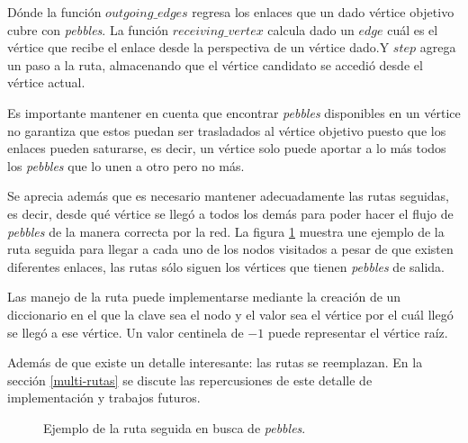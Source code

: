 Dónde la función $outgoing\_edges$ regresa los enlaces que un dado vértice objetivo cubre con \emph{pebbles}. La función $receiving\_vertex$ calcula dado un $edge$ cuál es el vértice que recibe el enlace desde la perspectiva de un vértice dado.Y $step$ agrega un paso a la ruta, almacenando que el vértice candidato se accedió desde el vértice actual.

Es importante mantener en cuenta que encontrar \emph{pebbles} disponibles en un vértice no garantiza que estos puedan ser trasladados al vértice objetivo puesto que los enlaces pueden saturarse, es decir, un vértice solo puede aportar a lo más todos los \emph{pebbles} que lo unen a otro pero no más.

Se aprecia además que es necesario mantener adecuadamente las rutas seguidas, es decir, desde qué vértice se llegó a todos los demás para poder hacer el flujo de \emph{pebbles} de la manera correcta por la red. La figura \ref{fig:ruta} muestra une ejemplo de la ruta seguida para llegar a cada uno de los nodos visitados a pesar de que existen diferentes enlaces, las rutas sólo siguen los vértices que tienen \emph{pebbles} de salida.

Las manejo de la ruta puede implementarse mediante la creación de un diccionario en el que la clave sea el nodo y el valor sea el vértice por el cuál llegó se llegó a ese vértice. Un valor centinela de $-1$ puede representar el vértice raíz.

Además de que existe un detalle interesante: las rutas se reemplazan. En la sección \ref{multi-rutas} se discute las repercusiones de este detalle de implementación y trabajos futuros.

\begin{figure}
\center
{}
\caption{Ejemplo de la ruta seguida en busca de \emph{pebbles}.}
\label{fig:ruta}
\end{figure}

